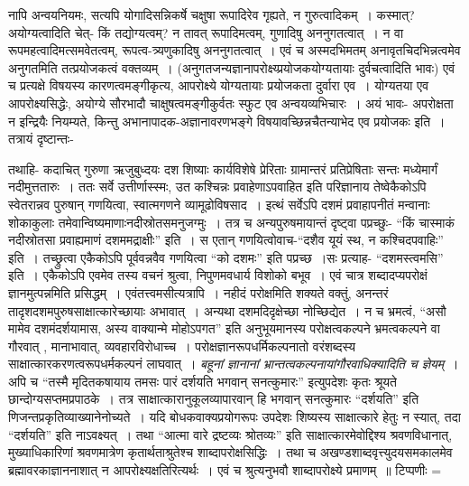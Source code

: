 {नापि अन्वयनियमः, सत्यपि योगादिसन्निकर्षे चक्षुषा रूपादिरेव गृह्यते, न गुरुत्वादिकम्~। कस्मात्? अयोग्यत्वादिति चेत्- किं तद्योग्यत्वम्? न तावत् रूपादिमत्वम्, गुणादिषु अननुगतत्वात्~। न वा रूपमहत्वादिमत्समवेतत्वम्, रूपत्व-त्र्यणुकादिषु अननुगतत्वात्~। एवं च अस्मदभिमतम् अनावृतचिदभिन्नत्वमेव अनुगतमिति तत्प्रयोजकत्वं वक्तव्यम्~। (अनुगतजन्यज्ञानापरोक्ष्य्प्रयोजकयोग्यतायाः दुर्वचत्वादिति भावः) एवं च प्रत्यक्षे विषयस्य कारणत्वमङ्गीकृत्य, आपरोक्ष्ये योग्यतायाः प्रयोजकता दुर्वारा एव~। योग्यतया एव आपरोक्ष्यसिद्धेः, अयोग्ये सौरभादौ चाक्षुषत्वमङ्गीकुर्वतः स्फुट एव अन्वयव्यभिचारः~। अयं भावः- अपरोक्षता न इन्द्रियैः नियम्यते, किन्तु अभानापादक-अज्ञानावरणभङ्गे विषयावच्छिन्नचैतन्याभेद एव प्रयोजकः इति~। तत्रायं दृष्टान्तः-

तथाहि- कदाचित् गुरुणा ऋजुबुध्दयः दश शिष्याः कार्यविशेषे प्रेरिताः ग्रामान्तरं प्रति\break प्रेषिताः सन्तः मध्येमार्गं नदीमुत्ततारुः~। ततः सर्वे उत्तीर्णास्स्मः, उत कश्चिन्नः प्रवाहेणाऽपवा\-हित इति परिज्ञानाय तेष्वेकैकोऽपि स्वेतरान्नव पुरुषान् गणयित्वा, स्वात्मगणने व्यामूढो\break विषसाद~। इत्थं सर्वेऽपि दशमं प्रवाहापनीतं मन्वानाः शोकाकुलाः तमेवान्विष्यमाणाः\break नदीस्रोतसमनुजग्मुः~। तत्र च अन्यपुरुषमायान्तं दृष्ट्वा पप्रच्छुः- “किं चास्माकं नदीस्रोतसा प्रवाह्यमाणं दशममद्राक्षीः” इति~। स एतान् गणयित्वोवाच-“दशैव यूयं स्थ, न कश्चि\-दपवाहिः” इति~। तच्छ्रुत्वा एकैकोऽपि पूर्ववन्नवैव गणयित्वा “को दशमः” इति पप्रच्छ~।\break सः प्रत्याह- “दशमस्त्वमसि” इति~। एकैकोऽपि एवमेव तस्य वचनं श्रुत्वा, निपुणमवधार्य विशोको बभूव~। एवं चात्र शब्दादप्यपरोक्षं ज्ञानमुत्पन्नमिति प्रसिद्धम्~। एवं\break तत्त्वमसीत्यत्रापि~। नहीदं परोक्षमिति शक्यते वक्तुं, अनन्तरं तादृशदशम\-पुरुषसाक्षात्कारेच्छायाः अभावात्~। अन्यथा दशमदिदृक्षेच्छा नोच्छिद्येत~। न च भ्रमत्वं, “असौ मामेव दशमं\break दर्शयामास, अस्य वाक्यान्मे मोहोऽपगत” इति अनुभूयमानस्य परोक्षत्वकल्पने भ्रमत्व\-कल्पने वा गौरवात् , मानाभावात्, व्यवहारविरोधाच्च~। परोक्षज्ञानरूपधर्मिकल्पनातो वरं\break शब्दस्य साक्षात्कारकरणत्वरूपधर्मकल्पनं लाघवात्~। \textit{बहूनां ज्ञानानां भ्रान्तत्वकल्पनायां\break गौरवाधिक्यादिति च ज्ञेयम्}~। अपि च “तस्मै मृदितकषायाय तमसः पारं दर्शयति भगवान् सनत्कुमारः” इत्युपदेशः कृतः श्रूयते छान्दोग्यसप्तमप्रपाठके~। तत्र साक्षात्कारानुकूलव्यापारवान् हि भगवान् सनत्कुमारः “दर्शयति” इति णिजन्तप्रकृतिव्याख्यानेनोच्यते~। यदि बोधकवाक्यप्रयोगरूपः उपदेशः शिष्यस्य साक्षात्कारे हेतुः न स्यात्, तदा “दर्शयति” इति नाऽवक्ष्यत्~। तथा “आत्मा वारे द्रष्टव्यः श्रोतव्यः” इति साक्षात्कारमेवोद्दिश्य श्रवणविधानात्, मुख्याधिकारिणां श्रवणमात्रेण कृतार्थताश्रुतेश्च शाब्दापरोक्षसिद्धिः~। तथा च अखण्डशाब्दवृत्त्युदयसमकालमेव ब्रह्मावरकाज्ञाननाशात् न आपरोक्ष्यक्षतिरित्यर्थः~। एवं च श्रुत्यनुभवौ शाब्दापरोक्ष्ये प्रमाणम्~॥ टिप्पणीः =

}
